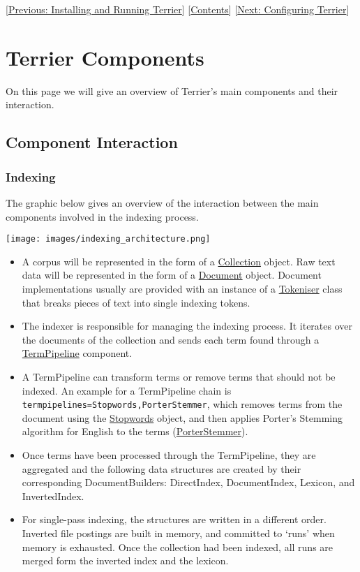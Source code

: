 {[}\href{quickstart.html}{Previous: Installing and Running Terrier}{]}
{[}\href{index.html}{Contents}{]} {[}\href{configure_general.html}{Next:
Configuring Terrier}{]}

\section{Terrier Components}\label{terrier-components}

On this page we will give an overview of Terrier's main components and
their interaction.

\subsection{Component Interaction}\label{component-interaction}

\subsubsection{Indexing}\label{indexing}

The graphic below gives an overview of the interaction between the main
components involved in the indexing process.

\texttt{[image: images/indexing\_architecture.png]}

\begin{itemize}
\tightlist
\item
  A corpus will be represented in the form of a
  \href{javadoc/org/terrier/indexing/Collection.html}{Collection}
  object. Raw text data will be represented in the form of a
  \href{javadoc/org/terrier/indexing/Document.html}{Document} object.
  Document implementations usually are provided with an instance of a
  \href{javadoc/org/terrier/indexing/tokenisation/Tokeniser.html}{Tokeniser}
  class that breaks pieces of text into single indexing tokens.
\item
  The indexer is responsible for managing the indexing process. It
  iterates over the documents of the collection and sends each term
  found through a
  \href{javadoc/org/terrier/terms/TermPipeline.html}{TermPipeline}
  component.
\item
  A TermPipeline can transform terms or remove terms that should not be
  indexed. An example for a TermPipeline chain is
  \texttt{termpipelines=Stopwords,PorterStemmer}, which removes terms
  from the document using the
  \href{javadoc/org/terrier/terms/Stopwords.html}{Stopwords} object, and
  then applies Porter's Stemming algorithm for English to the terms
  (\href{javadoc/org/terrier/terms/PorterStemmer.html}{PorterStemmer}).
\item
  Once terms have been processed through the TermPipeline, they are
  aggregated and the following data structures are created by their
  corresponding DocumentBuilders: DirectIndex, DocumentIndex, Lexicon,
  and InvertedIndex.
\item
  For single-pass indexing, the structures are written in a different
  order. Inverted file postings are built in memory, and committed to
  `runs' when memory is exhausted. Once the collection had been indexed,
  all runs are merged form the inverted index and the lexicon.
\end{itemize}

